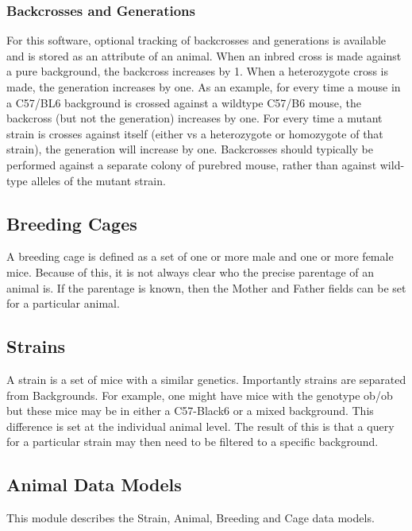 \documentclass[letterpaper,10pt,english]{sphinxmanual}
\begin{document}
\subsubsection{Backcrosses and Generations}
\label{animals:backcrosses-and-generations}
For this software, optional tracking of backcrosses and generations is available and is stored as an attribute of an animal.  When an inbred cross is made against a pure background, the backcross increases by 1.  When a heterozygote cross is made, the generation increases by one.  As an example, for every time a mouse in a C57/BL6 background is crossed against a wildtype C57/B6 mouse, the backcross (but not the generation) increases by one.  For every time a mutant strain is crosses against itself (either vs a heterozygote or homozygote of that strain), the generation will increase by one.  Backcrosses should typically be performed against a separate colony of purebred mouse, rather than against wild-type alleles of the mutant strain.


\subsection{Breeding Cages}
\label{animals:breeding-cages}
A breeding cage is defined as a set of one or more male and one or more female mice.  Because of this, it is not always clear who the precise parentage of an animal is.  If the parentage is known, then the Mother and Father fields can be set for a particular animal.


\subsection{Strains}
\label{animals:strains}
A strain is a set of mice with a similar genetics.  Importantly strains are separated from Backgrounds.  For example, one might have mice with the genotype ob/ob but these mice may be in either a C57-Black6 or a mixed background.  This difference is set at the individual animal level.  
The result of this is that a query for a particular strain may then need to be filtered to a specific background.


\subsection{Animal Data Models}
\label{animals:module-mousedb.animal.models}\label{animals:animal-data-models}
This module describes the Strain, Animal, Breeding and Cage data models.
\end{document}

